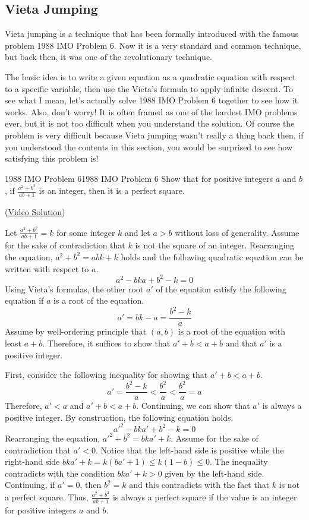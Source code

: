 \documentclass[../../main.tex]{subfiles}
\begin{document}
\subsection{Vieta Jumping}

Vieta jumping is a technique that has been formally introduced
with the famous problem 1988 IMO Problem 6. Now it is a very
standard and common technique, but back then, it was one of the
revolutionary technique.

The basic idea is to write a given equation as a quadratic
equation with respect to a specific variable, then use the
Vieta's formula to apply infinite descent. To see what I mean,
let's actually solve 1988 IMO Problem 6 together to see how it
works. Also, don't worry! It is often framed as one of the
hardest IMO problems ever, but it is not too difficult when you
understand the solution. Of course the problem is very difficult
because Vieta jumping wasn't really a thing back then, if you
understood the contents in this section, you would be surprised
to see how satisfying this problem is!

\begin{problem}{1988 IMO Problem 6}{1988 IMO Problem 6}
Show that for positive integers $a$ and $b$, if
$\frac{a^2 + b^2}{ab + 1}$ is an integer, then it is a perfect
square.
\end{problem}
(\href{https://youtu.be/rU1e7ttQmh4}{Video Solution})
\begin{solution}
Let $\frac{a^2 + b^2}{ab + 1} = k$ for some integer $k$ and let
$a > b$ without loss of generality. Assume for the sake of
contradiction that $k$ is not the square of an integer.
Rearranging the equation, $a^2 + b^2 = abk + k$ holds and the
following quadratic equation can be written with respect to $a$.
\[
a^2 - bka + b^2 - k = 0
\]
Using Vieta's formulas, the other root $a'$ of the equation satisfy
the following equation if $a$ is a root of the equation.
\[
a'
= bk - a
= \frac{b^2 - k}{a}
\]
Assume by well-ordering principle that $(a, b)$ is a root of the
equation with least $a + b$. Therefore, it suffices to show that
$a' + b < a + b$ and that $a'$ is a positive integer.

First, consider the following inequality for showing that
$a' + b < a + b$.
\[
a'
= \frac{b^2 - k}{a}
< \frac{b^2}{a}
< \frac{b^2}{a}
= a
\]
Therefore, $a' < a$ and $a' + b < a + b$. Continuing, we can show
that $a'$ is always a positive integer. By construction, the following
equation holds.
\[
a'^2 - bka' + b^2 - k = 0
\]
Rearranging the equation, $a'^2 + b^2 = bka' + k$. Assume for the
sake of contradiction that $a' < 0$. Notice that the left-hand
side is positive while the right-hand side $bka' + k = k(ba' + 1) \leq
k(1 - b) \leq 0$. The inequality contradicts with the condition
$bka' + k > 0$ given by the left-hand side. Continuing, if $a' = 0$,
then $b^2 = k$ and this contradicts with the fact that $k$ is not
a perfect square. Thus, $\frac{a^2 + b^2}{ab + 1}$ is always a
perfect square if the value is an integer for positive integers
$a$ and $b$.
\end{solution}
\end{document}
